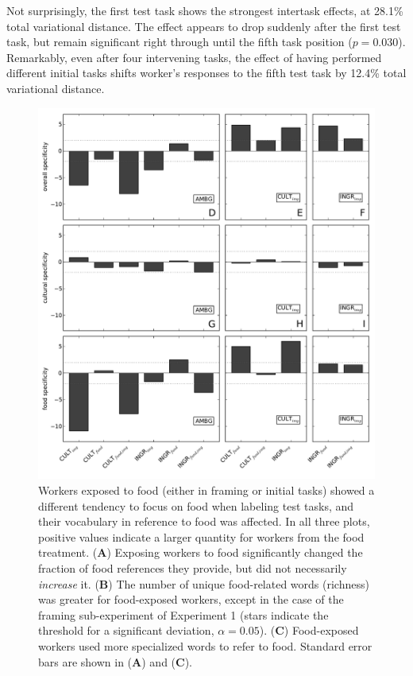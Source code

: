 \documentclass{sigchi}
\begin{document}
Not surprisingly, the first test task shows the strongest intertask 
effects, at 28.1\% total variational distance.  The effect appears to 
drop suddenly after the first test task, but remain significant 
right through until the fifth task position ($p=0.030$).
Remarkably, even after four intervening tasks, the effect of 
having performed different initial tasks shifts worker's responses to the
fifth test task by 12.4\% total variational distance.

\begin{figure}
	\centering
	\includegraphics[scale=0.97]{figs/specificity.pdf}
	\caption{
		Workers exposed to food (either in framing or initial tasks)
		showed a different tendency to focus on food when labeling
		test tasks, and their vocabulary in reference to food was affected.
		In all three plots, positive values indicate a larger quantity for 
		workers from the food treatment.
		(\textbf{A}) Exposing workers to food significantly changed the 
		fraction of food references they provide, but did not necessarily 
		\textit{increase} it.
		(\textbf{B}) The number of unique food-related
		words (richness) was greater for food-exposed workers, 
		except in the 
		case of the framing sub-experiment of Experiment 1 
		(stars indicate the threshold
		for a significant deviation, $\alpha=0.05$). 
		(\textbf{C}) Food-exposed
		workers used more specialized words to refer to food.
		Standard error bars are shown in (\textbf{A}) and (\textbf{C}).
	}
	\label{fig:specificity}
\end{figure}
\end{document}
